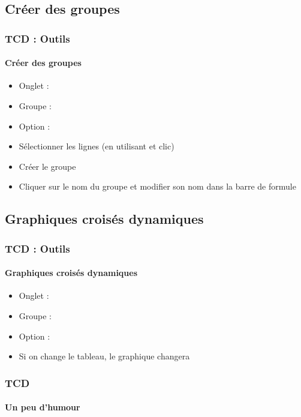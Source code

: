 \documentclass[xcolor=table, usenames,dvipsnames]{beamer}
\begin{document}
\subsection{Créer des groupes}

\begin{frame}
\frametitle{TCD : Outils}
\framesubtitle{Créer des groupes}

\begin{minipage}{0.49\textwidth}
	\begin{itemize}
		\item Onglet : 
		\item Groupe : 
		\item Option : 
		\item Sélectionner les lignes (en utilisant  et clic)
		\item Créer le groupe
		\item Cliquer sur le nom du groupe et modifier son nom dans la barre de formule
	\end{itemize}
\end{minipage}
%
\begin{minipage}{0.5\textwidth} 
\end{minipage}

\end{frame}


\subsection{Graphiques croisés dynamiques}

\begin{frame}
\frametitle{TCD : Outils}
\framesubtitle{Graphiques croisés dynamiques}

\begin{minipage}{0.34\textwidth}
	\begin{itemize}
		\item Onglet : 
		\item Groupe : 
		\item Option : 
		\item Si on change le tableau, le graphique changera
	\end{itemize}
\end{minipage}
%
\begin{minipage}{0.65\textwidth} 
	
\end{minipage}

\end{frame}

\begin{frame}
\frametitle{TCD}
\framesubtitle{Un peu d'humour}

\begin{center}
\end{center}

\end{frame}


\end{document}
